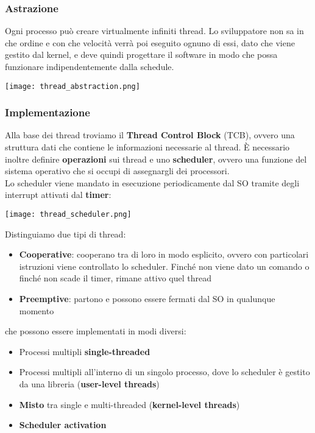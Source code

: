\subsubsection{Astrazione}
Ogni processo può creare virtualmente infiniti thread. Lo sviluppatore non sa in che ordine e con che velocità verrà poi eseguito ognuno di essi, dato che viene gestito dal kernel, e deve quindi progettare il software in modo che possa funzionare indipendentemente dalla schedule.
\begin{center}
	\texttt{[image: thread\_abstraction.png]}
\end{center}

\subsubsection{Implementazione}
Alla base dei thread troviamo il \textbf{Thread Control Block} (TCB), ovvero una struttura dati che contiene le informazioni necessarie al thread. È necessario inoltre definire \textbf{operazioni} sui thread e uno \textbf{scheduler}, ovvero una funzione del sistema operativo che si occupi di assegnargli dei processori.\\
Lo scheduler viene mandato in esecuzione periodicamente dal SO tramite degli interrupt attivati dal \textbf{timer}:
\begin{center}
	\texttt{[image: thread\_scheduler.png]}
\end{center}
Distinguiamo due tipi di thread:
\begin{itemize}
	\item \textbf{Cooperative}: \label{thread_types}cooperano tra di loro in modo esplicito, ovvero con particolari istruzioni viene controllato lo scheduler. Finché non viene dato un comando o finché non scade il timer, rimane attivo quel thread
	\item \textbf{Preemptive}: partono e possono essere fermati dal SO in qualunque momento
\end{itemize}
che possono essere implementati in modi diversi:
\begin{itemize}
	\item Processi multipli \textbf{single-threaded}
	\item Processi multipli all'interno di un singolo processo, dove lo scheduler è gestito da una libreria (\textbf{user-level threads})
	\item \textbf{Misto} tra single e multi-threaded (\textbf{kernel-level threads})
	\item \textbf{Scheduler activation}
\end{itemize}

